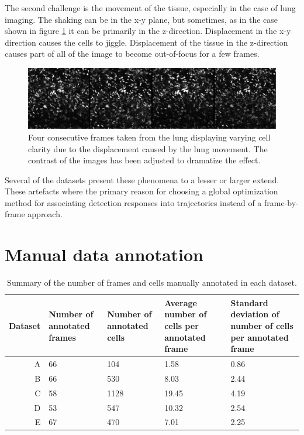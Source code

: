 	The second challenge is the movement of the tissue, especially in the case of lung imaging. The shaking can be in the x-y plane, but sometimes, as in the case shown in figure \cref{fig:data_challenges_movement} it can be primarily in the z-direction. Displacement in the x-y direction causes the cells to jiggle. Displacement of the tissue in the z-direction causes part of all of the image to become out-of-focus for a few frames.
	
	\begin{figure}[h]

		\includegraphics[width=\textwidth]{images/data_challenge_movement}

		\caption{Four consecutive frames taken from the lung displaying varying cell clarity due to the displacement caused by the lung movement. The contrast of the images has been adjusted to dramatize the effect.}
		\label{fig:data_challenges_movement}
	\end{figure}
	
	Several of the datasets present these phenomena to a lesser or larger extend. These artefacts where the primary reason for choosing a global optimization method for associating detection responses into trajectories instead of a frame-by-frame approach.
	
	\section{Manual data annotation \statusnew}
	


	\begin{table}[h]
		\centering
		\begin{tabular}{rp{3cm}p{3cm}p{3cm}p{4cm}}
			Dataset & Number of annotated frames & Number of annotated cells & Average number of cells per annotated frame & Standard deviation of number of cells per annotated frame \\
		\hline
			      A &    66   &   104 &   1.58  &    0.86  \\
			      B &    66   &   530 &   8.03  &    2.44  \\
			      C &    58   &  1128 &  19.45  &    4.19 \\
			      D &    53   &   547 &  10.32  &    2.54 \\
			      E &    67   &   470 &   7.01  &    2.25 
		\end{tabular} 
		\caption{
			Summary of the number of frames and cells manually annotated in each dataset.}
		\label{tab:results_data_count}
	\end{table}

